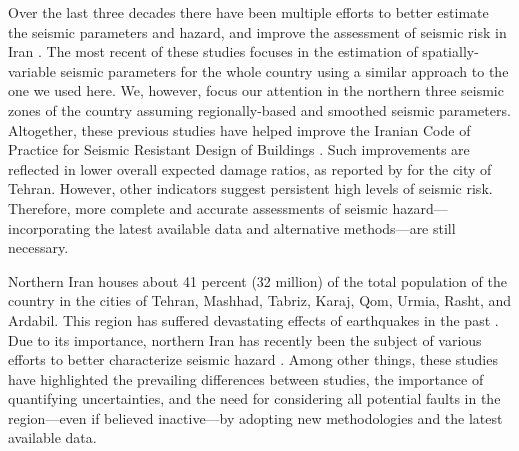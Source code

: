 Over the last three decades there have been multiple efforts to better estimate the seismic parameters and hazard, and improve the assessment of seismic risk in Iran \citep[e.g.,][]{Tavakoli1999, Moinfar_2000_Chap, Ghodrati2003, Moinfar_2012_WCEE, Khodaverdian_2016_BSSA}. The most recent of these studies \citep{Khodaverdian_2016_BSSA} focuses in the estimation of spatially-variable seismic parameters for the whole country using a similar approach to the one we used here. We, however, focus our attention in the northern three seismic zones of the country assuming regionally-based and smoothed seismic parameters. Altogether, these previous studies have helped improve the Iranian Code of Practice for Seismic Resistant Design of Buildings \citep{BHRC2014}. Such improvements are reflected in lower overall expected damage ratios, as reported by \citet{Ghodrati2013} for the city of Tehran. However, other indicators suggest persistent high levels of seismic risk. Therefore, more complete and accurate assessments of seismic hazard---incorporating the latest available data and alternative methods---are still necessary.

Northern Iran houses about 41 percent (32 million) of the total population of the country in the cities of Tehran, Mashhad, Tabriz, Karaj, Qom, Urmia, Rasht, and Ardabil. This region has suffered devastating effects of earthquakes in the past \citep[e.g.,][]{Mehrain_1990_Tech, Chafory-Ashtiany_1999_DPM, Razzaghi_2012_Tech}. Due to its importance, northern Iran has recently been the subject of various efforts to better characterize seismic hazard \citep[e.g.,][]{Abdollahzadeh2014a, Boostan2015}. Among other things, these studies have highlighted the prevailing differences between studies, the importance of quantifying uncertainties, and the need for considering all potential faults in the region---even if believed inactive---by adopting new methodologies and the latest available data.

